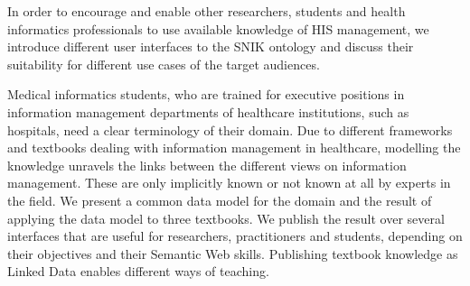 \documentclass[conference]{IEEEtran}
\begin{document}
In order to encourage and enable other researchers, students and health informatics professionals to use available knowledge of HIS management, we introduce different user interfaces to the SNIK ontology and discuss their suitability for different use cases of the target audiences.

Medical informatics students, who are trained for executive positions in information management departments of healthcare institutions, such as hospitals, need a clear terminology of their domain.
Due to different frameworks and textbooks dealing with information management in healthcare, modelling the knowledge unravels the links between the different views on information management.
These are only implicitly known or not known at all by experts in the field.
%
We present a common data model for the domain and the result of applying the data model to three textbooks.
We publish the result over several interfaces that are useful for researchers, practitioners and students, depending on their objectives and their Semantic Web skills.
%
Publishing textbook knowledge as Linked Data enables different ways of teaching.
\end{document}
